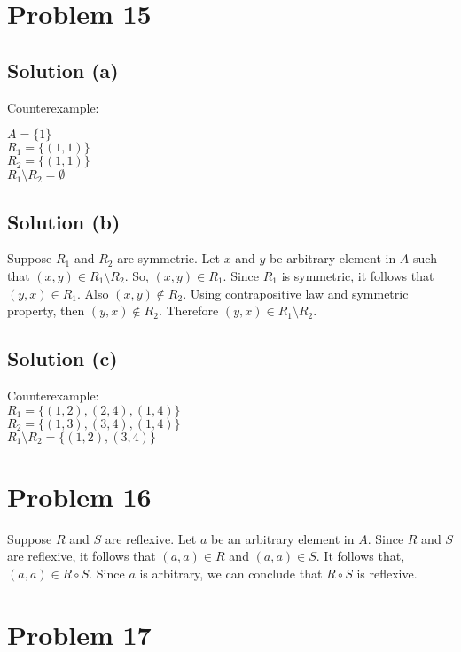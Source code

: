 \documentclass{article}
\begin{document}
\section{Problem 15}

\subsection{Solution (a)}

Counterexample:

$A = \{1\}$ \\
$R_1 = \{(1,1)\}$ \\
$R_2 = \{(1,1)\}$ \\
$R_1 \setminus R_2 = \emptyset$

\subsection{Solution (b)}

Suppose $R_1$ and $R_2$ are symmetric. Let $x$ and $y$ be arbitrary
element in $A$ such that $(x,y) \in R_1 \setminus R_2$. So,
$(x,y) \in R_1$. Since $R_1$ is symmetric, it follows that
$(y,x) \in R_1$. Also $(x,y) \notin R_2$. Using contrapositive law and
symmetric property, then $(y,x) \notin R_2$. Therefore $(y,x) \in
R_1 \setminus R_2$.

\subsection{Solution (c)}

Counterexample: \\
$R_1 = \{(1,2),(2,4),(1,4)\}$ \\
$R_2 = \{(1,3),(3,4),(1,4)\}$ \\
$R_1 \setminus R_2 = \{(1,2), (3,4)\}$

\section{Problem 16}

Suppose $R$ and $S$ are reflexive. Let $a$ be an arbitrary element in
$A$. Since $R$ and $S$ are reflexive, it follows that $(a,a) \in R$
and $(a,a) \in S$. It follows that, $(a,a) \in R \circ S$. Since $a$
is arbitrary, we can conclude that $R \circ S$ is reflexive.

\section{Problem 17}
\end{document}
